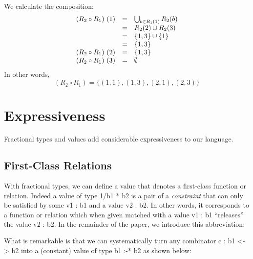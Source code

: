 \documentclass{llncs}
\begin{document}
\begin{example}
\[\begin{array}{rcl}
\end{array}\]
We calculate the composition:
\[\begin{array}[t]{rcl}                                                                  
(R_2 \circ R_1)~(1) &=& \bigcup_{b \in R_1(1)} R_2(b) \\                               
         &=& R_2(2) \cup R_2(3) \\                                                     
         &=& \{1,3\} \cup \{ 1 \} \\                                                   
         &=& \{ 1,3 \} \\                                                              
(R_2 \circ R_1)~(2) &=& \{ 1,3 \} \\                                                   
(R_2 \circ R_1)~(3) &=& \emptyset                                                      
\end{array}\]
In other words, 
\[
(R_2 \circ R_1) = \{(1,1), (1,3), (2,1), (2,3)\}
\]
\end{example}

\section{Expressiveness} 

Fractional types and values add considerable expressiveness to our
language.

\subsection{First-Class Relations}

With fractional types, we can define a value that denotes a first-class
function or relation. Indeed a value of type {{1/b1 * b2}} is a pair of a
\emph{constraint} that can only be satisfied by some {{v1 : b1}} and a value
{{v2 : b2}}. In other words, it corresponds to a function or relation which
when given matched with a value {{v1 : b1}} ``releases'' the value 
{{v2 : b2}}. In the remainder of the paper, we introduce this abbreviation:


What is remarkable is that we can systematically turn any combinator
{{c : b1 <-> b2}} into a (constant) value of type {{b1 :-* b2}} as
shown below:
\end{document}
